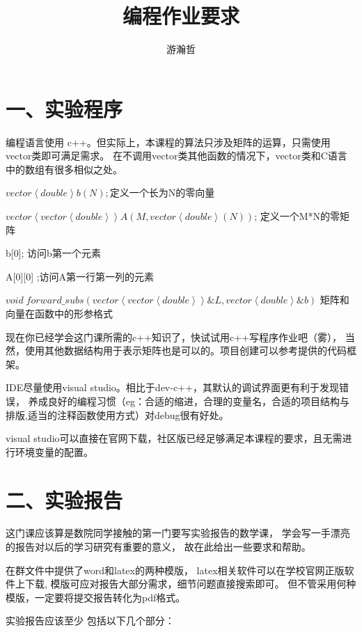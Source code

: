 \documentclass{article}
\title{编程作业要求}
\author{游瀚哲}
\begin{document}
\maketitle

\section*{一、实验程序}

编程语言使用 c++。但实际上，本课程的算法只涉及矩阵的运算，只需使用vector类即可满足需求。
在不调用vector类其他函数的情况下，vector类和C语言中的数组有很多相似之处。

$vector	\left \langle double \right \rangle b(N); $定义一个长为N的零向量

$vector \left \langle vector\left \langle double \right \rangle \right \rangle  A(M, vector\left \langle double \right \rangle(N))$; 
定义一个M*N的零矩阵

b[0]; 访问b第一个元素
 
A[0][0] ;访问A第一行第一列的元素

$void \; forward\_ subs(vector \left \langle vector\left \langle double \right \rangle \right \rangle \& L, vector	\left \langle double \right \rangle \& b)$ 
矩阵和向量在函数中的形参格式

现在你已经学会这门课所需的c++知识了，快试试用c++写程序作业吧（雾），
当然，使用其他数据结构用于表示矩阵也是可以的。项目创建可以参考提供的代码框架。

IDE尽量使用visual studio。相比于dev-c++，其默认的调试界面更有利于发现错误，
养成良好的编程习惯（eg：合适的缩进，合理的变量名，合适的项目结构与排版,适当的注释函数使用方式）对debug很有好处。

visual studio可以直接在官网下载，社区版已经足够满足本课程的要求，且无需进行环境变量的配置。 



\section*{二、实验报告}

这门课应该算是数院同学接触的第一门要写实验报告的数学课，
学会写一手漂亮的报告对以后的学习研究有重要的意义，
故在此给出一些要求和帮助。

在群文件中提供了word和latex的两种模版，
latex相关软件可以在学校官网正版软件上下载,
模版可应对报告大部分需求，细节问题直接搜索即可。
但不管采用何种模版，一定要将提交报告转化为pdf格式。

实验报告应该至少 包括以下几个部分：
\end{document}
